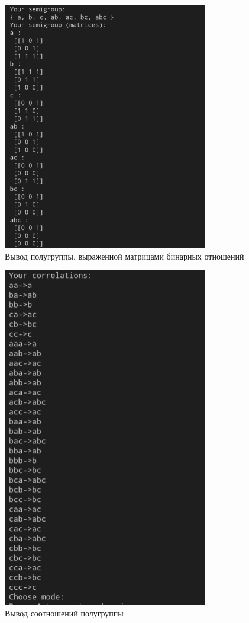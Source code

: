 \documentclass[bachelor, och, labwork]{shiza}
\begin{document}
      \begin{figure}[H]
        \centering
        \includegraphics[width=0.8\textwidth]{photo/3.png}
        \caption{Вывод полугруппы, выраженной матрицами бинарных отношений}
      \end{figure}


      \begin{figure}[H]
        \centering
        \includegraphics[width=0.8\textwidth]{photo/4.png}
        \caption{Вывод соотношений полугруппы}
      \end{figure}
\end{document}
